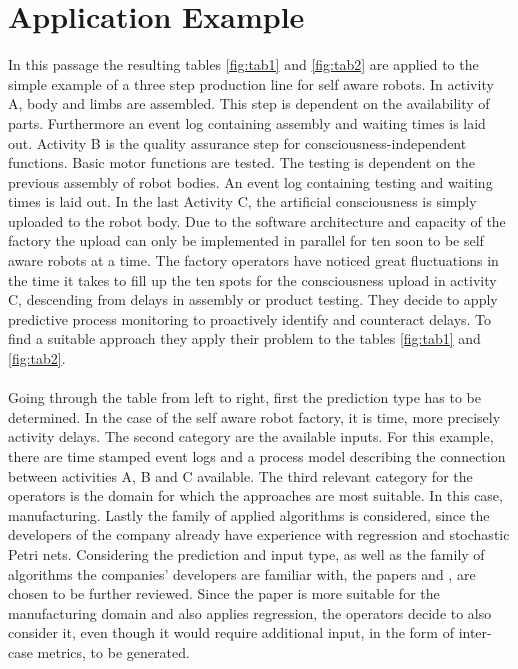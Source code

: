 \documentclass{llncs}
\begin{document}
{{{{{{\section{Application Example}\label{sec:app}
In this passage the resulting tables \ref{fig:tab1} and \ref{fig:tab2} are applied to the simple example of a three step production line for self aware robots.
In activity A, body and limbs are assembled. This step is dependent on the availability of parts. Furthermore an event log containing assembly and waiting times is laid out.
Activity B is the quality assurance step for consciousness-independent functions. Basic motor functions are tested. The testing is dependent on the previous assembly of robot bodies. 
An event log containing testing and waiting times is laid out.
In the last Activity C, the artificial consciousness is simply uploaded to the robot body. Due to the software architecture and capacity of the factory the upload can only be implemented 
in parallel for ten soon to be self aware robots at a time.
The factory operators have noticed great fluctuations in the time it takes to fill up the ten spots for the consciousness upload in activity C, descending from delays in 
assembly or product testing. They decide to apply predictive process monitoring to proactively identify and counteract delays. To find a suitable approach they apply their problem to the 
tables \ref{fig:tab1} and \ref{fig:tab2}.
\paragraph{}
Going through the table from left to right, first the prediction type has to be determined. In the case of the self aware robot factory, it is time, more precisely activity delays.
The second category are the available inputs. For this example, there are time stamped event logs and a process model describing the connection between activities A, B and C available.
The third relevant category for the operators is the domain for which the approaches are most suitable. In this case, manufacturing.
Lastly the family of applied algorithms is considered, since the developers of the company already have experience with regression and stochastic Petri nets.
Considering the prediction and input type, as well as the family of algorithms the companies' developers are familiar with, the papers \cite{rogge2015time} and \cite{verenich2017white}, 
are chosen to be further reviewed.
Since the paper \cite{senderovich2017intra} is more suitable for the manufacturing domain and also applies regression, the operators decide to also consider it, even though it would require 
additional input, in the form of inter-case metrics, to be generated.






}}}}}}
\end{document}
